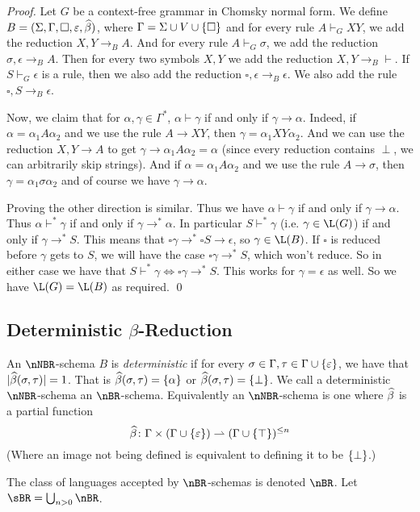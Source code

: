 \documentclass{llncs}
\begin{document}
\begin{proof}

    Let $G$ be a context-free grammar in Chomsky normal form.
    We define $B=(\Sigma,\Gamma,\square,\varepsilon,\widehat\beta)$, where $\Gamma=\Sigma\cup V\cup\set\square$ and for every rule
    $A\vdash_GXY$, we add the reduction $X,Y\to_BA$.
    And for every rule $A\vdash_G\sigma$, we add the reduction $\sigma,\epsilon\to_BA$.
    Then for every two symbols $X,Y$ we add the reduction $X,Y\to_B\vdash$.
    If $S\vdash_G\epsilon$ is a rule, then we also add the reduction $\square,\epsilon\to_B\epsilon$.
    We also add the rule $\square,S\to_B\epsilon$.

    Now, we claim that for $\alpha,\gamma\in\Gamma^*$, $\alpha\vdash\gamma$ if and only if $\gamma\to\alpha$.
    Indeed, if $\alpha=\alpha_1A\alpha_2$ and we use the rule $A\to XY$, then $\gamma=\alpha_1XY\alpha_2$.
    And we can use the reduction $X,Y\to A$ to get $\gamma\to\alpha_1A\alpha_2=\alpha$ (since every reduction contains $\perp$,
    we can arbitrarily skip strings).
    And if $\alpha=\alpha_1A\alpha_2$ and we use the rule $A\to\sigma$, then $\gamma=\alpha_1\sigma\alpha_2$ and of course we
    have $\gamma\to\alpha$.

    Proving the other direction is similar.
    Thus we have $\alpha\vdash\gamma$ if and only if $\gamma\to\alpha$.
    Thus $\alpha\vdash^*\gamma$ if and only if $\gamma\to^*\alpha$.
    In particular $S\vdash^*\gamma$ (i.e. $\gamma\in\L(G)$) if and only if $\gamma\to^*S$.
    This means that $\square\gamma\to^*\square S\to\epsilon$, so $\gamma\in\L(B)$.
    If $\square$ is reduced before $\gamma$ gets to $S$, we will have the case $\square\gamma\to^*S$, which won't reduce.
    So in either case we have that $S\vdash^*\gamma\iff\square\gamma\to^*S$.
    This works for $\gamma=\epsilon$ as well.
    So we have $\L(G)=\L(B)$ as required.
    \qed

\end{proof}

\subsection{Deterministic $\beta$-Reduction}

\begin{definition}

    An $\nNBR$-schema $B$ is \emph{deterministic} if for every $\sigma\in\Gamma,\tau\in\Gamma\cup\set\epsilon$, we have that
    $\lvert\widehat\beta(\sigma,\tau)\rvert=1$.
    That is $\hb(\sigma,\tau)=\set\alpha$ or $\hb(\sigma,\tau)=\set\perp$.
    We call a deterministic $\nNBR$-schema an $\nBR$-schema.
    Equivalently an $\nNBR$-schema is one where $\widehat\beta$ is a partial function
    $$ \hb\colon\Gamma\times(\Gamma\cup\set\epsilon) \partial (\Gamma\cup\set\top)^{\leq n} $$
    (Where an image not being defined is equivalent to defining it to be $\set\perp$.)

    The class of languages accepted by $\nBR$-schemas is denoted $\nBR$.
    Let $\sBR=\bigcup_{n>0}\nBR$.

\end{definition}
\end{document}
